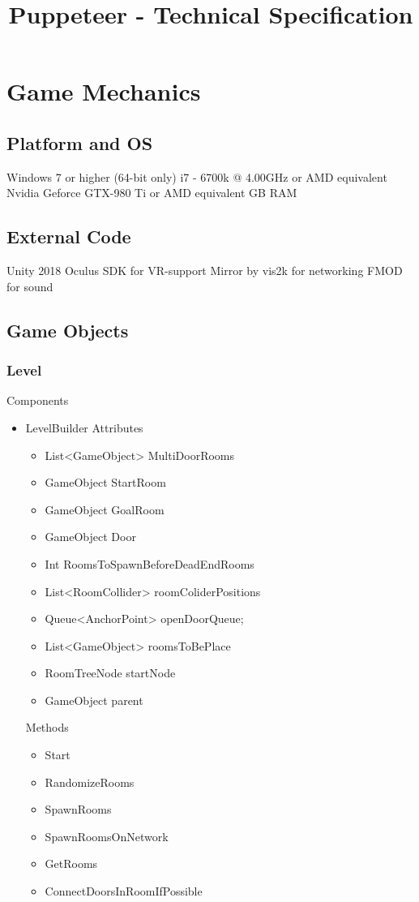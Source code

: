 \documentclass[11pt]{article}
\title{Puppeteer - Technical Specification}
\begin{document}
\maketitle


\newpage
\section{Game Mechanics}
\subsection{Platform and OS}
Windows 7 or higher (64-bit only)
\newline i7 - 6700k @ 4.00GHz or AMD equivalent
\newline Nvidia Geforce GTX-980 Ti or AMD equivalent
 GB RAM

\subsection{External Code}
Unity 2018
\newline Oculus SDK for VR-support
\newline Mirror by vis2k for networking
\newline FMOD for sound

\subsection{Game Objects}
\subsubsection{Level}
Components
\begin{itemize}
\item LevelBuilder
\newline Attributes
\begin{itemize}
\item List<GameObject> MultiDoorRooms
\item GameObject StartRoom
\item GameObject GoalRoom
\item GameObject Door
\item Int RoomsToSpawnBeforeDeadEndRooms
\item List<RoomCollider> roomColiderPositions
\item Queue<AnchorPoint> openDoorQueue;
\item List<GameObject> roomsToBePlace
\item RoomTreeNode startNode
\item GameObject parent
\end{itemize}
Methods
\begin{itemize}
\item Start
\item RandomizeRooms
\item SpawnRooms
\item SpawnRoomsOnNetwork
\item GetRooms
\item ConnectDoorsInRoomIfPossible
\end{itemize}
\end{itemize}
\end{document}
